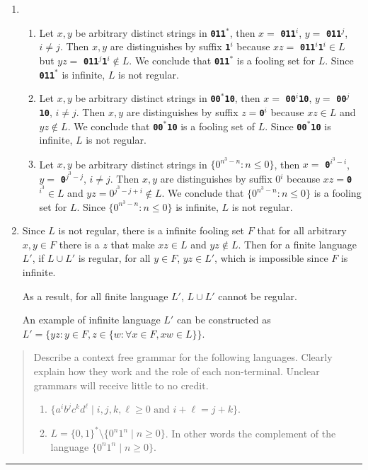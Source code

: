 \documentclass[11pt]{article}
\def\Sym#1{\textbf{\texttt{\color{BrickRed}#1}}}
\begin{document}
\begin{solution}
\begin{enumerate}
	\item 
		\begin{enumerate}
			\item
				Let $x, y$ be arbitrary distinct strings in \Sym0\Sym1\Sym1$^*$, then $x =$ \Sym0\Sym1\Sym1$^i$, $y =$ \Sym0\Sym1\Sym1$^j$, $i \neq j$. Then $x, y$ are distinguishes by suffix \Sym1$^i$ because $xz = $ \Sym0\Sym1\Sym1$^i$\Sym1$^i \in L$ but $yz = $ \Sym0\Sym1\Sym1$^j$\Sym1$^i \notin L$. We conclude that \Sym0\Sym1\Sym1$^*$ is a fooling set for $L$. Since \Sym0\Sym1\Sym1$^*$ is infinite, $L$ is not regular.
			\item
				Let $x, y$ be arbitrary distinct strings in \Sym0\Sym0$^*$\Sym1\Sym0, then $x =$ \Sym0\Sym0$^i$\Sym1\Sym0, $y =$ \Sym0\Sym0$^j$\Sym1\Sym0, $i \neq j$. Then $x, y$ are distinguishes by suffix $z = $\Sym0$^i$ because $xz \in L$ and $yz \notin L$. We conclude that \Sym0\Sym0$^*$\Sym1\Sym0 is a fooling set of $L$. Since \Sym0\Sym0$^*$\Sym1\Sym0 is infinite, $L$ is not regular.
			\item 
				Let $x, y$ be arbitrary distinct strings in $\{0^{n^3 - n} : n \leq 0\}$, then $x =$ \Sym0$^{i^3 - i}$, $y =$ \Sym0$^{j^3 - j}$, $i \neq j$. Then $x, y$ are distinguishes by suffix 0$^i$ because $xz = $\Sym0$^{i^3} \in L$ and $yz = $0$^{j^3 - j + i} \notin L$. We conclude that $\{0^{n^3 - n} : n \leq 0\}$ is a fooling set for $L$. Since $\{0^{n^3 - n} : n \leq 0\}$ is infinite, $L$ is not regular.
		\end{enumerate}
		\item
		Since $L$ is not regular, there is a infinite fooling set $F$ that for all arbitrary $x, y \in F$ there is a $z$ that make $xz \in L$ and $yz \notin L$. Then for a finite language $L'$, if $L \cup L'$ is regular, for all $y \in F$, $yz \in L'$, which is impossible since $F$ is infinite. 
		
		As a result, for all finite language $L'$, $L \cup L'$ cannot be regular.
		
		An example of infinite language $L'$ can be constructed as $L' = \{yz : y \in F, z \in \{w : \forall x \in F, xw \in L\}\}$.
\end{enumerate}
\end{solution}
\clearpage



\begin{quote}
Describe a context free grammar for the following languages.
Clearly explain how they work and the role of each non-terminal.
Unclear grammars will receive little to no credit.
\begin{enumerate}
\item $\{a^ib^jc^kd^\ell \mid  i,j,k,\ell \ge 0 \mbox{~and~} i+\ell = j+k\}$.
\item $L = \{0,1\}^* \setminus \{ 0^n1^n \mid n \ge 0\}$. In other words
the complement of the language $\{ 0^n1^n \mid n \ge 0\}$.
\end{enumerate}
\end{quote}
\hrule
\end{document}
